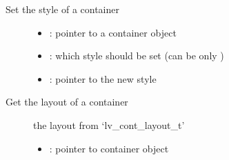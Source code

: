 \documentclass[letterpaper,10pt,english]{sphinxmanual}
\begin{document}
\begin{fulllineitems}
\label{\detokenize{object-types/cont:_CPPv417lv_cont_set_styleP8lv_obj_t15lv_cont_style_tPK10lv_style_t}}%
\pysigstartmultiline
{}\label{\detokenize{object-types/cont:lv__cont_8h_1a95732d0875f31b6a31e5b2e2c89e713b}}%
\pysigstopmultiline
Set the style of a container \begin{description}
\item[{}] \leavevmode\begin{itemize}
\item {} 
: pointer to a container object 

\item {} 
: which style should be set (can be only ) 

\item {} 
: pointer to the new style 

\end{itemize}

\end{description}


\end{fulllineitems}


\begin{fulllineitems}
\label{\detokenize{object-types/cont:_CPPv418lv_cont_get_layoutPK8lv_obj_t}}%
\pysigstartmultiline
{}\label{\detokenize{object-types/cont:lv__cont_8h_1a05b2b4350bb55dd9e1d369e067fb4fcd}}%
\pysigstopmultiline
Get the layout of a container \begin{description}
\item[{}] \leavevmode
the layout from ‘lv\_cont\_layout\_t’ 

\item[{}] \leavevmode\begin{itemize}
\item {} 
: pointer to container object 

\end{itemize}

\end{description}


\end{fulllineitems}
\end{document}
